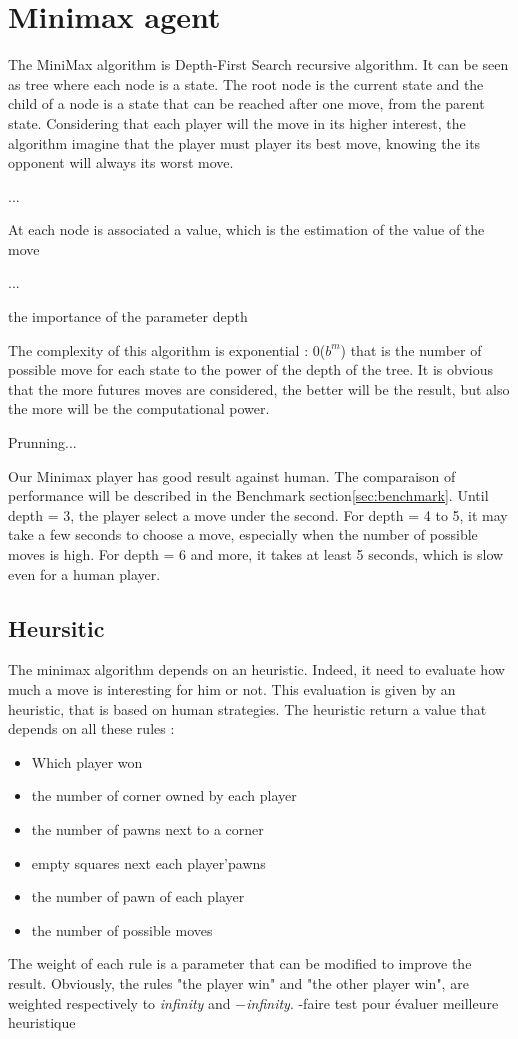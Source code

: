 \documentclass{article}
\begin{document}
\section{Minimax agent}
The MiniMax algorithm is Depth-First Search recursive algorithm. It can be seen as tree where each node is a state.
The root node is the current state and the child of a node is a state that can be reached after one move, from the parent state.
Considering that each player will the move in its higher interest, the algorithm imagine that the player must player its best move, knowing the its opponent will always its worst move.

...

At each node is associated a value, which is the estimation of the value of the move

...

the importance of the parameter depth

The complexity of this algorithm is exponential : 0($b^m$) that is the number of possible move for each state to the power of the depth of the tree.
It is obvious that the more futures moves are considered, the better will be the result, but also the more will be the computational power.

Prunning...

Our Minimax player has good result against human. The comparaison of performance will be described in the Benchmark section\ref{sec:benchmark}.
Until depth = 3, the player select a move under the second.
For depth = 4 to 5, it may take a few seconds to choose a move, especially when the number of possible moves is high.
For depth = 6 and more, it takes at least 5 seconds, which is slow even for a human player.

\subsection{Heursitic}
The minimax algorithm depends on an heuristic. Indeed, it need to evaluate how much a move is interesting for him %
or not. This evaluation is given by an heuristic, that is based on human strategies.
The heuristic return a value that depends on all these rules :
\begin{itemize}
    \item Which player won
    \item the number of corner owned by each player
    \item the number of pawns next to a corner
    \item empty squares next each player'pawns
    \item the number of pawn of each player
    \item the number of possible moves
\end{itemize}
The weight of each rule is a parameter that can be modified to improve the result. Obviously, the rules "the player win" and "the other player win", are weighted respectively
to \textit{infinity} and $-$\textit{infinity}.
 -faire test pour évaluer meilleure heuristique
\end{document}
